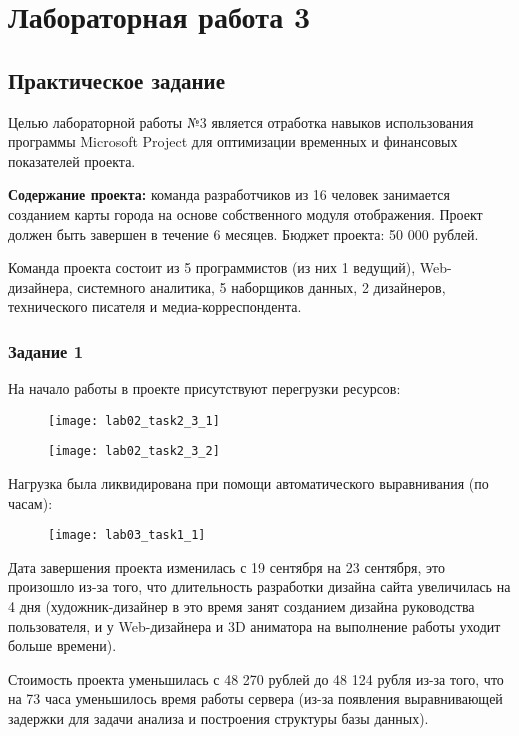 \chapter{Лабораторная работа 3}
\section*{Практическое задание}

Целью лабораторной работы №3 является отработка навыков использования программы Microsoft Project для оптимизации временных и финансовых показателей проекта.

\textbf{Содержание проекта:} команда разработчиков из 16 человек занимается созданием карты города на основе собственного модуля отображения. Проект должен быть завершен в течение 6 месяцев. Бюджет проекта: 50 000 рублей.

Команда проекта состоит из 5 программистов (из них 1 ведущий), Web-дизайнера, системного аналитика, 5 наборщиков данных, 2 дизайнеров, технического писателя и медиа-корреспондента.

\subsection*{Задание 1}

На начало работы в проекте присутствуют перегрузки ресурсов: 

\begin{figure}[h!]
	\texttt{[image: lab02\_task2\_3\_1]}
\end{figure}

\begin{figure}[h!]
	\texttt{[image: lab02\_task2\_3\_2]}
\end{figure}


Нагрузка была ликвидирована при помощи автоматического выравнивания (по часам):

\begin{figure}[h!]
	\texttt{[image: lab03\_task1\_1]}
\end{figure}


Дата завершения проекта изменилась с 19 сентября на 23 сентября, это произошло из-за того, что длительность разработки дизайна сайта увеличилась на 4 дня (художник-дизайнер в это время занят созданием дизайна руководства пользователя, и у Web-дизайнера и 3D аниматора на выполнение работы уходит больше времени).

Стоимость проекта уменьшилась с 48 270 рублей до 48 124 рубля из-за того, что на 73 часа уменьшилось время работы сервера (из-за появления выравнивающей задержки для задачи анализа и построения структуры базы данных).

